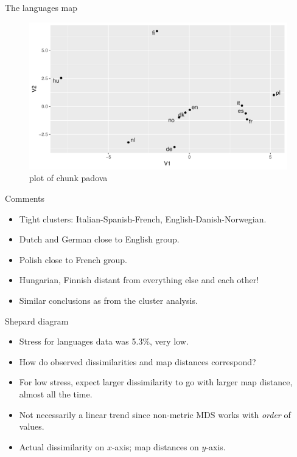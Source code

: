 \documentclass[ignorenonframetext,]{beamer}
\begin{document}
\begin{frame}{The languages map}
\protect\hypertarget{the-languages-map}{}

\begin{figure}
\centering
\includegraphics{figure/padova-1.pdf}
\caption{plot of chunk padova}
\end{figure}

\end{frame}

\begin{frame}{Comments}
\protect\hypertarget{comments-2}{}

\begin{itemize}
\item
  Tight clusters: Italian-Spanish-French, English-Danish-Norwegian.
\item
  Dutch and German close to English group.
\item
  Polish close to French group.
\item
  Hungarian, Finnish distant from everything else and each other!
\item
  Similar conclusions as from the cluster analysis.
\end{itemize}

\end{frame}

\begin{frame}{Shepard diagram}
\protect\hypertarget{shepard-diagram}{}

\begin{itemize}
\item
  Stress for languages data was 5.3\%, very low.
\item
  How do observed dissimilarities and map distances correspond?
\item
  For low stress, expect larger dissimilarity to go with larger map
  distance, almost all the time.
\item
  Not necessarily a linear trend since non-metric MDS works with
  \emph{order} of values.
\item
  Actual dissimilarity on \(x\)-axis; map distances on \(y\)-axis.
\end{itemize}

\end{frame}
\end{document}
